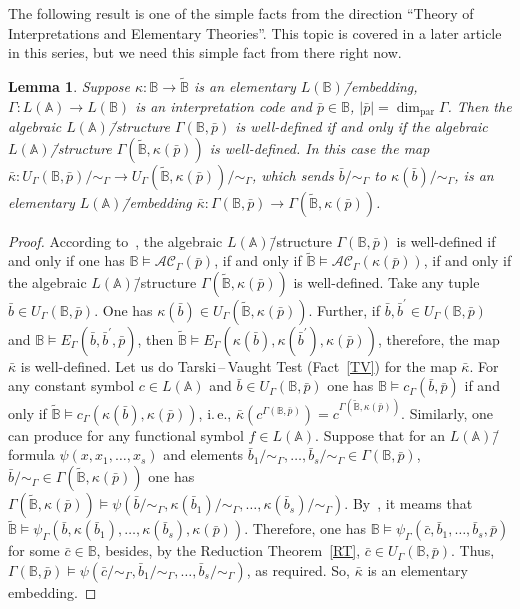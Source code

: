 \documentclass[12pt]{article}
\newtheorem{lemma}{Lemma}
\theoremstyle{definition}
\def\MA{{\mathbb{A}}}
\def\MB{{\mathbb{B}}}
\newcommand{\nsB}{\widetilde{\mathbb B}}
\def\param{{\mathrm{par}}}
\def\AC{\mathcal {AC}}
\begin{document}
The following result is one of the simple facts from the direction ``Theory of Interpretations and Elementary Theories''. This topic is covered in a later article in this series, but we need this simple fact from there right now.

\begin{lemma}\label{elem_emb}
Suppose $\kappa\colon \MB\to\nsB$ is an elementary $L(\MB)$\=/embedding, $\Gamma\colon L(\MA)\to L(\MB)$ is an interpretation code and $\bar p\in \MB$, $|\bar p|=\dim_\param\Gamma$. Then the algebraic $L(\MA)$\=/structure $\Gamma(\MB,\bar p)$ is well-defined if and only if the algebraic $L(\MA)$\=/structure $\Gamma(\nsB,\kappa(\bar p))$ is well-defined. In this case the map $\bar\kappa\colon U_\Gamma(\MB,\bar p)/{\sim_\Gamma}\to U_\Gamma(\nsB,\kappa(\bar p))/{\sim_\Gamma}$, which sends $\bar b/{\sim_\Gamma}$ to $\kappa(\bar b)/{\sim_\Gamma}$, is an elementary $L(\MA)$\=/embedding $\bar\kappa\colon \Gamma(\MB,\bar p)\to \Gamma(\nsB,\kappa(\bar p))$.
\end{lemma}

\begin{proof}
According to~\cite[Proposition~1]{Th_int1}, the algebraic $L(\MA)$\=/structure $\Gamma(\MB,\bar p)$ is well-defined if and only if one has $\MB\models\AC_\Gamma(\bar p)$, if and only if $\nsB\models\AC_\Gamma(\kappa(\bar p))$, if and only if the algebraic $L(\MA)$\=/structure $\Gamma(\nsB,\kappa(\bar p))$ is well-defined. Take any tuple $\bar b\in U_\Gamma(\MB,\bar p)$. One has $\kappa(\bar b)\in U_\Gamma(\nsB,\kappa(\bar p))$. Further, if $\bar b,\bar b^\prime\in U_\Gamma(\MB,\bar p)$ and $\MB\models E_\Gamma(\bar b,\bar b^\prime,\bar p)$, then $\nsB\models E_\Gamma(\kappa(\bar b),\kappa(\bar b^\prime),\kappa(\bar p))$, therefore, the map $\bar\kappa$ is well-defined. Let us do Tarski\,--\,Vaught Test (Fact~\ref{TV}) for the map $\bar\kappa$. For any constant symbol $c\in L(\MA)$ and $\bar b\in U_\Gamma(\MB,\bar p)$ one has $\MB\models c_\Gamma(\bar b,\bar p)$ if and only if $\nsB\models c_\Gamma(\kappa(\bar b),\kappa(
    \bar p))$, i.\,e., $\bar\kappa(c^{\Gamma(\MB,\bar p)})=c^{\Gamma(\nsB,\kappa(\bar p))}$. Similarly, one can produce for any functional symbol $f\in L(\MA)$. Suppose that for an $L(\MA)$\=/formula $\psi(x,x_1,\ldots,x_s)$ and elements $\bar b_1/{\sim_\Gamma},\ldots,\bar b_s/{\sim_\Gamma}\in \Gamma(\MB,\bar p)$, $\bar b/{\sim_\Gamma}\in \Gamma(\nsB,\kappa(\bar p))$ one has $\Gamma(\nsB,\kappa(\bar p))\models \psi(\bar b/{\sim_\Gamma}, \kappa(\bar b_1)/{\sim_\Gamma},\ldots,\kappa(\bar b_s)/{\sim_\Gamma})$. By~\cite[Corollary~2]{Th_int1}, it meams that $\nsB\models\psi_\Gamma(\bar b,\kappa(\bar b_1),\ldots,\kappa(\bar b_s),\kappa(\bar p))$. Therefore, one has $\MB\models \psi_\Gamma(\bar c,\bar b_1,\ldots,\bar b_s,\bar p)$ for some $\bar c\in \MB$, besides, by the Reduction Theorem~\ref{RT}, $\bar c\in U_\Gamma(\MB,\bar p)$. Thus, $\Gamma(\MB,\bar p)\models \psi(\bar c/{\sim_\Gamma},\bar b_1/{\sim_\Gamma},\ldots,\bar b_s/{\sim_\Gamma})$, as required. So, $\bar\kappa$ is an elementary embedding.
\end{proof}
\end{document}

